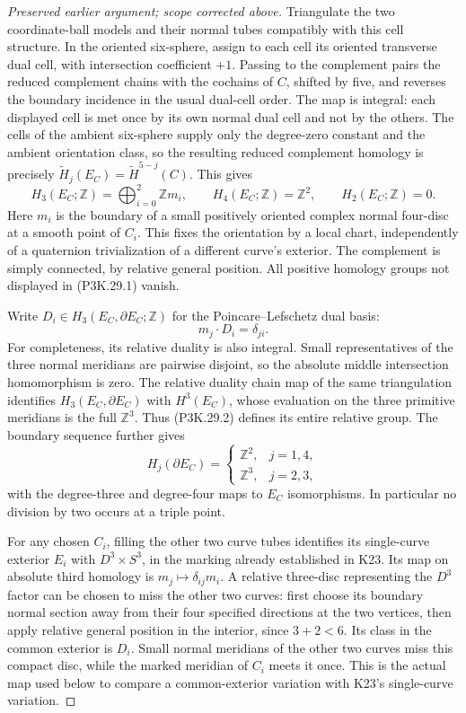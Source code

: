 \begin{proof}[Preserved earlier argument; scope corrected above]
Triangulate the two coordinate-ball models and their
normal tubes compatibly with this cell structure.
In the oriented six-sphere, assign to each cell its
oriented transverse dual cell, with intersection
coefficient \(+1\). Passing to the complement pairs the
reduced complement chains with the cochains of \(C\),
shifted by five, and reverses the boundary incidence
in the usual dual-cell order. The map is integral:
each displayed cell is met once by its own normal
dual cell and not by the others. The cells of the
ambient six-sphere supply only the degree-zero
constant and the ambient orientation class, so the
resulting reduced complement homology is precisely
\(\widetilde H_j(E_C)=\widetilde H^{5-j}(C)\).
This gives
\[
 H_3(E_C;\mathbb Z)=\bigoplus_{i=0}^2\mathbb Z m_i,\qquad
 H_4(E_C;\mathbb Z)=\mathbb Z^2,\qquad H_2(E_C;\mathbb Z)=0.
                                                        \tag{P3K.29.1}
\]
Here \(m_i\) is the boundary of a small positively oriented complex
normal four-disc at a smooth point of \(C_i\). This fixes the
orientation by a local chart, independently of a quaternion
trivialization of a different curve's exterior. The complement is
simply connected, by relative general position. All positive
homology groups not displayed in (P3K.29.1) vanish.

Write \(D_i\in H_3(E_C,\partial E_C;\mathbb Z)\) for the
Poincare--Lefschetz dual basis:
\[
                    m_j\cdot D_i=\delta_{ji}.
                                                        \tag{P3K.29.2}
\]
For completeness, its relative duality is also integral.
Small representatives of the three normal meridians
are pairwise disjoint, so the absolute middle
intersection homomorphism is zero. The relative
duality chain map of the same triangulation identifies
\(H_3(E_C,\partial E_C)\) with \(H^3(E_C)\), whose
evaluation on the three primitive meridians is the
full \(\mathbb Z^3\). Thus (P3K.29.2) defines its entire
relative group. The boundary sequence further gives
\[
 H_j(\partial E_C)=
 \begin{cases}
  \mathbb Z^2,&j=1,4,\\
  \mathbb Z^3,&j=2,3,
 \end{cases}
\]
with the degree-three and degree-four maps to \(E_C\)
isomorphisms. In particular no division by two occurs
at a triple point.

For any chosen \(C_i\), filling the other two curve tubes identifies
its single-curve exterior \(E_i\) with \(D^3\times S^3\), in the
marking already established in K23. Its map on absolute third
homology is \(m_j\mapsto\delta_{ij}m_i\). A relative three-disc
representing the \(D^3\) factor can be chosen to miss the other two
curves: first choose its boundary normal section away from their
four specified directions at the two vertices, then apply relative
general position in the interior, since \(3+2<6\).
Its class in the common exterior is \(D_i\). Small normal
meridians of the other two curves miss this compact disc, while
the marked meridian of \(C_i\) meets it once. This is the actual
map used below to compare a common-exterior variation with K23's
single-curve variation.


\end{proof}
